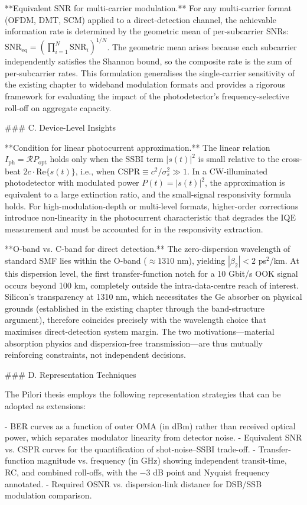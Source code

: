 **Equivalent SNR for multi-carrier modulation.** For any multi-carrier format (OFDM, DMT, SCM) applied to a direct-detection channel, the achievable information rate is determined by the geometric mean of per-subcarrier SNRs: $\mathrm{SNR}_\mathrm{eq} = \left(\prod_{i=1}^N \mathrm{SNR}_i\right)^{1/N}$. The geometric mean arises because each subcarrier independently satisfies the Shannon bound, so the composite rate is the sum of per-subcarrier rates. This formulation generalises the single-carrier sensitivity of the existing chapter to wideband modulation formats and provides a rigorous framework for evaluating the impact of the photodetector's frequency-selective roll-off on aggregate capacity.

### C. Device-Level Insights

**Condition for linear photocurrent approximation.** The linear relation $I_\mathrm{ph} = \mathcal{R} P_\mathrm{opt}$ holds only when the SSBI term $|s(t)|^2$ is small relative to the cross-beat $2c \cdot \mathrm{Re}\{s(t)\}$, i.e., when $\mathrm{CSPR} \equiv c^2/\sigma_s^2 \gg 1$. In a CW-illuminated photodetector with modulated power $P(t) = |s(t)|^2$, the approximation is equivalent to a large extinction ratio, and the small-signal responsivity formula holds. For high-modulation-depth or multi-level formats, higher-order corrections introduce non-linearity in the photocurrent characteristic that degrades the IQE measurement and must be accounted for in the responsivity extraction.

**O-band vs. C-band for direct detection.** The zero-dispersion wavelength of standard SMF lies within the O-band ($\approx 1310$ nm), yielding $|\beta_2| < 2$ ps$^2$/km. At this dispersion level, the first transfer-function notch for a 10 Gbit/s OOK signal occurs beyond 100 km, completely outside the intra-data-centre reach of interest. Silicon's transparency at 1310 nm, which necessitates the Ge absorber on physical grounds (established in the existing chapter through the band-structure argument), therefore coincides precisely with the wavelength choice that maximises direct-detection system margin. The two motivations—material absorption physics and dispersion-free transmission—are thus mutually reinforcing constraints, not independent decisions.

### D. Representation Techniques

The Pilori thesis employs the following representation strategies that can be adopted as extensions:

- BER curves as a function of outer OMA (in dBm) rather than received optical power, which separates modulator linearity from detector noise.
- Equivalent SNR vs. CSPR curves for the quantification of shot-noise–SSBI trade-off.
- Transfer-function magnitude vs. frequency (in GHz) showing independent transit-time, RC, and combined roll-offs, with the $-3$ dB point and Nyquist frequency annotated.
- Required OSNR vs. dispersion-link distance for DSB/SSB modulation comparison.


